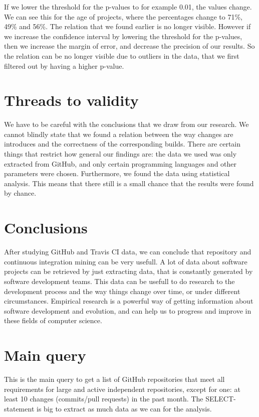 \documentclass[a4paper,11pt]{article}
\begin{document}
			If we lower the threshold for the p-values to for example 0.01, the values change. We can see this for the age of projects, where the percentages change to 71\%, 49\% and 56\%. The relation that we found earlier is no longer visible. However if we increase the confidence interval by lowering the threshold for the p-values, then we increase the margin of error, and decrease the precision of our results. So the relation can be no longer visible due to outliers in the data, that we first filtered out by having a higher p-value. 
			
	\section{Threads to validity}
		We have to be careful with the conclusions that we draw from our research. We cannot blindly state that we found a relation between the way changes are introduces and the correctness of the corresponding builds. There are certain things that restrict how general our findings are: the data we used was only extracted from GitHub, and only certain programming languages and other parameters were chosen. Furthermore, we found the data using statistical analysis. This means that there still is a small chance that the results were found by chance.
	
	\section{Conclusions}
		After studying GitHub and Travis CI data, we can conclude that repository and continuous integration mining can be very usefull. A lot of data about software projects can be retrieved by just extracting data, that is constantly generated by software development teams. This data can be usefull to do research to the development process and the way things change over time, or under different circumstances. Empirical research is a powerful way of getting information about software development and evolution, and can help us to progress and improve in these fields of computer science.

	\appendix
	\section{Main query}
	\label{app:mainquery}
	This is the main query to get a list of GitHub repositories that meet all requirements for large and active independent repositories, except for one: at least 10 changes (commits/pull requests) in the past month. The SELECT-statement is big to extract as much data as we can for the analysis.
	
\end{document}
